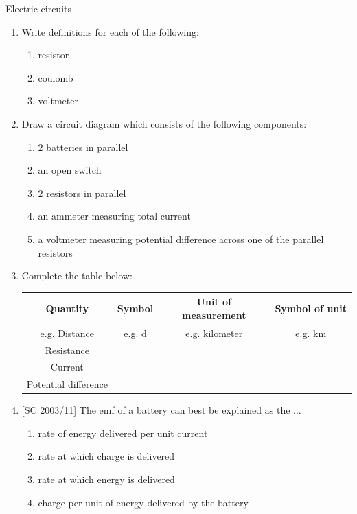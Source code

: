 \begin{eocexercises}{Electric circuits}

\begin{enumerate}[noitemsep, label=\textbf{\arabic*}. ] 
\item{ Write definitions for each of the following:
  \begin{enumerate}[noitemsep, label=\textbf{\arabic*}. ] 
  \item resistor
  \item coulomb
  \item voltmeter
  \end{enumerate}}

\item{ Draw a circuit diagram which consists of the following components:
  \begin{enumerate}[noitemsep, label=\textbf{\arabic*}. ] 
  \item 2 batteries in parallel
  \item an open switch
  \item 2 resistors in parallel
  \item an ammeter measuring total current
  \item a voltmeter measuring potential difference across one of the parallel resistors
  \end{enumerate}}

\item{ Complete the table below: \\

\begin{tabular}{ | c | c | c | c| } \hline 
\textbf{Quantity} & \textbf{Symbol} & \textbf{Unit of measurement} & \textbf{Symbol of unit} \\ \hline \hline 
e.g. Distance & e.g. d & e.g. kilometer & e.g. km \\ \hline 
Resistance &   &   &  \\ \hline
Current  &   &   &  \\ \hline
Potential difference  &   &   &  \\ \hline
\hline
\end{tabular}
}

\item{[SC 2003/11] The emf of a battery can best be explained as the $\dots$
\begin{enumerate}[noitemsep, label=\textbf{\arabic*}. ] 
\item{rate of energy delivered per unit current}
\item{rate at which charge is delivered}
\item{rate at which energy is delivered}
\item{charge per unit of energy delivered by the battery}
\end{enumerate}}


\end{enumerate}
\end{eocexercises}
